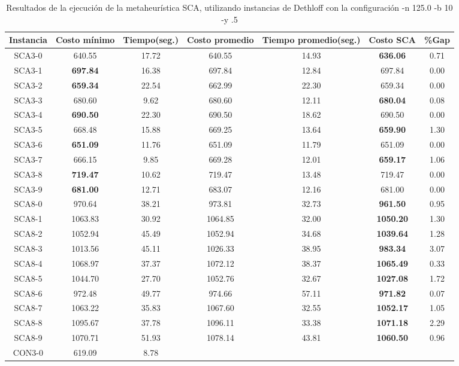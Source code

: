 \begin{table}[ht]
\caption{Resultados de la ejecución de la metaheurística SCA, utilizando instancias de Dethloff con la configuración -n 125.0 -b 10 -y .5}
\centering
\small
\begin{tabular}{c c c c c c c}
\hline\hline
Instancia & Costo mínimo & Tiempo(seg.) & Costo promedio & Tiempo promedio(seg.) & Costo SCA & \%Gap \\ [0.5ex]
\hline
SCA3-0 & 640.55 & 17.72 & 
640.55 & 14.93 & \bf{636.06} & 
0.71\\SCA3-1 & \bf{697.84} & 16.38 & 
697.84 & 12.84 & 697.84 & 0.00\\
SCA3-2 & \bf{659.34} & 22.54 & 
662.99 & 22.30 & 659.34 & 0.00\\
SCA3-3 & 680.60 & 9.62 & 
680.60 & 12.11 & \bf{680.04} & 
0.08\\SCA3-4 & \bf{690.50} & 22.30 & 
690.50 & 18.62 & 690.50 & 0.00\\
SCA3-5 & 668.48 & 15.88 & 
669.25 & 13.64 & \bf{659.90} & 
1.30\\SCA3-6 & \bf{651.09} & 11.76 & 
651.09 & 11.79 & 651.09 & 0.00\\
SCA3-7 & 666.15 & 9.85 & 
669.28 & 12.01 & \bf{659.17} & 
1.06\\SCA3-8 & \bf{719.47} & 10.62 & 
719.47 & 13.48 & 719.47 & 0.00\\
SCA3-9 & \bf{681.00} & 12.71 & 
683.07 & 12.16 & 681.00 & 0.00\\
SCA8-0 & 970.64 & 38.21 & 
973.81 & 32.73 & \bf{961.50} & 
0.95\\SCA8-1 & 1063.83 & 30.92 & 
1064.85 & 32.00 & \bf{1050.20} & 
1.30\\SCA8-2 & 1052.94 & 45.49 & 
1052.94 & 34.68 & \bf{1039.64} & 
1.28\\SCA8-3 & 1013.56 & 45.11 & 
1026.33 & 38.95 & \bf{983.34} & 
3.07\\SCA8-4 & 1068.97 & 37.37 & 
1072.12 & 38.37 & \bf{1065.49} & 
0.33\\SCA8-5 & 1044.70 & 27.70 & 
1052.76 & 32.67 & \bf{1027.08} & 
1.72\\SCA8-6 & 972.48 & 49.77 & 
974.66 & 57.11 & \bf{971.82} & 
0.07\\SCA8-7 & 1063.22 & 35.83 & 
1067.60 & 32.55 & \bf{1052.17} & 
1.05\\SCA8-8 & 1095.67 & 37.78 & 
1096.11 & 33.38 & \bf{1071.18} & 
2.29\\SCA8-9 & 1070.71 & 51.93 & 
1078.14 & 43.81 & \bf{1060.50} & 
0.96\\CON3-0 & 619.09 & 8.78 & 

\end{tabular}
\end{table}
